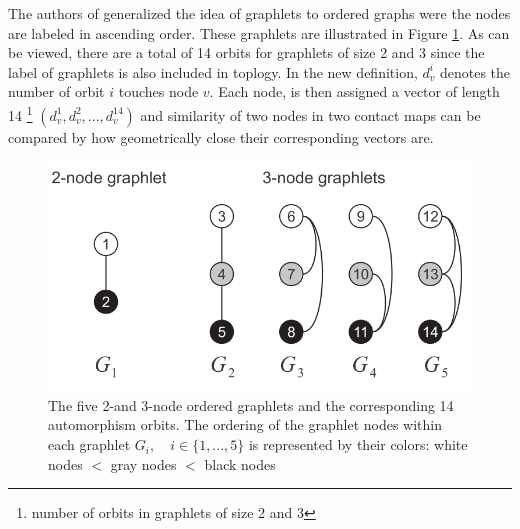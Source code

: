 \documentclass{article}
\begin{document}
The authors of \cite{di2010fast} generalized the idea of graphlets to 
ordered graphs were the nodes are labeled in ascending order.
These graphlets are illustrated in Figure \ref{fig:ordered_graphlets}.
As can be viewed, there are a total of 14 orbits for graphlets of size
2 and 3 since the label of graphlets is also included in toplogy.
In the new definition, $d_v^i$ denotes the number of orbit $i$ touches 
node $v$. Each node, is then assigned a vector of length 14 
\footnote{number of orbits in graphlets of size 2 and 3}
$(d_v^1, d_v^2, ..., d_v^{14})$ 
and similarity of two nodes in two contact maps can be compared by
how geometrically close their corresponding vectors are.
\begin{figure}[H]
    \centering
    \includegraphics[width=.5\textwidth]{figures/ordered_graphlets.png}
    \caption{The five 2-and 3-node ordered graphlets and the corresponding 14
    automorphism orbits. The ordering of the graphlet nodes within each
    graphlet $G_i,\quad i \in \{1, ... , 5\}$ is represented by their colors: white nodes
    $<$ gray nodes $<$ black nodes}
    \label{fig:ordered_graphlets}
\end{figure}
\end{document}
